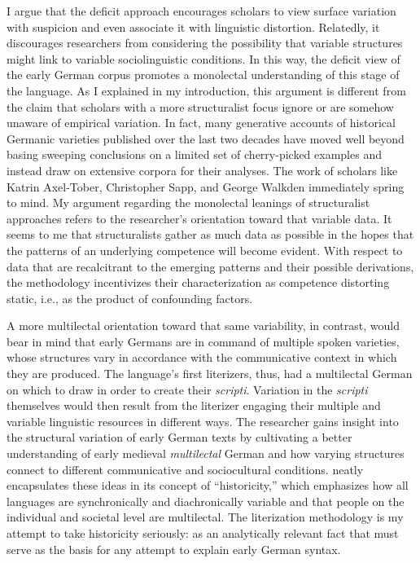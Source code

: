 I argue that the deficit approach encourages scholars to view surface variation with suspicion and even associate it with linguistic distortion. Relatedly, it discourages researchers from considering the possibility that variable structures might link to variable sociolinguistic conditions. In this way, the deficit view of the early German corpus promotes a monolectal understanding of this stage of the language. As I explained in my introduction, this argument is different from the claim that scholars with a more structuralist focus ignore or are somehow unaware of empirical variation. In fact, many generative accounts of historical Germanic varieties published over the last two decades have moved well beyond basing sweeping conclusions on a limited set of cherry-picked examples and instead draw on extensive corpora for their analyses. The work of scholars like Katrin Axel-Tober, Christopher Sapp, and George Walkden immediately spring to mind. My argument regarding the monolectal leanings of structuralist approaches refers to the researcher’s orientation toward that variable data. It seems to me that structuralists gather as much data as possible in the hopes that the patterns of an underlying competence will become evident. With respect to data that are recalcitrant to the emerging patterns and their possible derivations, the methodology incentivizes their characterization as competence distorting static, i.e., as the product of confounding factors.

A more multilectal orientation toward that same variability, in contrast, would bear in mind that early Germans are in command of multiple spoken varieties, whose structures vary in accordance with the communicative context in which they are produced. The language’s first literizers, thus, had a multilectal German on which to draw in order to create their \textit{scripti}. Variation in the \textit{scripti} themselves would then result from the literizer engaging their multiple and variable linguistic resources in different ways. The researcher gains insight into the structural variation of early German texts by cultivating a better understanding of early medieval \textit{multilectal} German and how varying structures connect to different communicative and sociocultural conditions. \citet{Coseriu1974} neatly encapsulates these ideas in its concept of “historicity,” which emphasizes how all languages are synchronically and diachronically variable and that people on the individual and societal level are multilectal. The literization methodology is my attempt to take historicity seriously: as an analytically relevant fact that must serve as the basis for any attempt to explain early German syntax.

